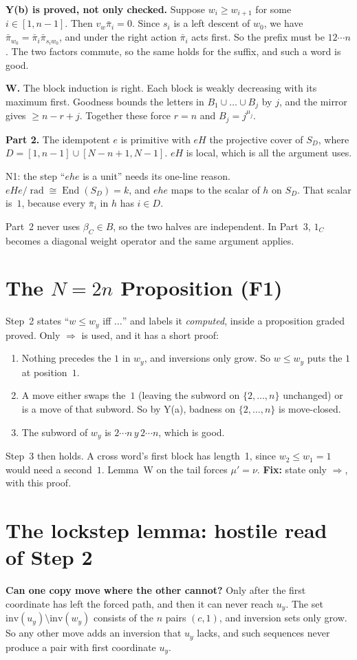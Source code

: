 \documentclass[11pt]{article}
\newcommand{\End}{\operatorname{End}}
\newcommand{\rad}{\operatorname{rad}}
\begin{document}
\textbf{Y(b) is proved, not only checked.} Suppose $w_i\ge w_{i+1}$ for some $i\in[1,n-1]$. Then $v_w\bar\pi_i=0$. Since $s_i$ is a left descent of $w_0$, we have $\bar\pi_{w_0}=\bar\pi_i\bar\pi_{s_iw_0}$, and under the right action $\bar\pi_i$ acts first. So the prefix must be $12\cdots n$. The two factors commute, so the same holds for the suffix, and such a word is good.

\textbf{W.} The block induction is right. Each block is weakly decreasing with its maximum first. Goodness bounds the letters in $B_1\cup\dots\cup B_j$ by $j$, and the mirror gives $\ge n-r+j$. Together these force $r=n$ and $B_j=j^{\mu_j}$.

\textbf{Part 2.} The idempotent $e$ is primitive with $eH$ the projective cover of $S_D$, where $D=[1,n-1]\cup[N-n+1,N-1]$. $eH$ is local, which is all the argument uses.

N1: the step ``$ehe$ is a unit'' needs its one-line reason. $eHe/\rad\cong\End(S_D)=k$, and $ehe$ maps to the scalar of $h$ on $S_D$. That scalar is~$1$, because every $\bar\pi_i$ in $h$ has $i\in D$.

Part~2 never uses $\beta_C\in B$, so the two halves are independent. In Part~3, $1_C$ becomes a diagonal weight operator and the same argument applies.

\section{The $N=2n$ Proposition (F1)}
Step~2 states ``$w\le w_y$ iff $\dots$'' and labels it \emph{computed}, inside a proposition graded proved. Only $\Rightarrow$ is used, and it has a short proof:
\begin{enumerate}[nosep]
\item Nothing precedes the $1$ in $w_y$, and inversions only grow. So $w\le w_y$ puts the $1$ at position~$1$.
\item A move either swaps the~$1$ (leaving the subword on $\{2,\dots,n\}$ unchanged) or is a move of that subword. So by Y(a), badness on $\{2,\dots,n\}$ is move-closed.
\item The subword of $w_y$ is $2\cdots n\,y\,2\cdots n$, which is good.
\end{enumerate}
Step~3 then holds. A cross word's first block has length~1, since $w_2\le w_1=1$ would need a second~$1$. Lemma~W on the tail forces $\mu'=\nu$. \textbf{Fix:} state only $\Rightarrow$, with this proof.

\section{The lockstep lemma: hostile read of Step 2}
\textbf{Can one copy move where the other cannot?} Only after the first coordinate has left the forced path, and then it can never reach $u_y$. The set $\mathrm{inv}(u_y)\setminus\mathrm{inv}(w_y)$ consists of the $n$ pairs $(c,1)$, and inversion sets only grow. So any other move adds an inversion that $u_y$ lacks, and such sequences never produce a pair with first coordinate $u_y$.
\end{document}
